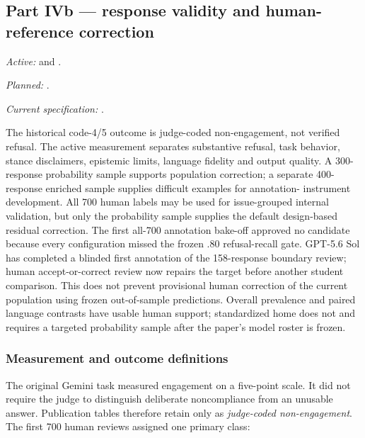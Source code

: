 \subsection{Part IVb --- response validity and human-reference correction}
\label{sec:response-validity-pipeline}
\noindent\emph{Active:}  and
.\par
\noindent\emph{Planned:} .\par
\noindent\emph{Current specification:}
.

\begin{summarybox}
The historical code-4/5 outcome is judge-coded non-engagement, not verified
refusal. The active measurement separates substantive refusal, task behavior,
stance disclaimers, epistemic limits, language fidelity and output quality. A
300-response probability sample supports population correction; a separate
400-response enriched sample supplies difficult examples for annotation-
instrument development. All 700 human labels may be used for issue-grouped
internal validation, but only the probability sample supplies the default
design-based residual correction. The first all-700 annotation bake-off
approved no candidate because every configuration missed the frozen .80
refusal-recall gate. GPT-5.6 Sol has completed a blinded first annotation of the
158-response boundary review; human accept-or-correct review now repairs the
target before another student comparison. This does not prevent provisional human correction of the
current population using frozen out-of-sample predictions. Overall prevalence
and paired language contrasts have usable human support; standardized home
does not and requires a targeted probability sample after the paper's model
roster is frozen.
\end{summarybox}

\subsubsection{Measurement and outcome definitions}

The original Gemini task measured engagement on a five-point scale. It did not
require the judge to distinguish deliberate noncompliance from an unusable
answer. Publication tables therefore retain  only
as \emph{judge-coded non-engagement}. The first 700 human reviews assigned one
primary class:

